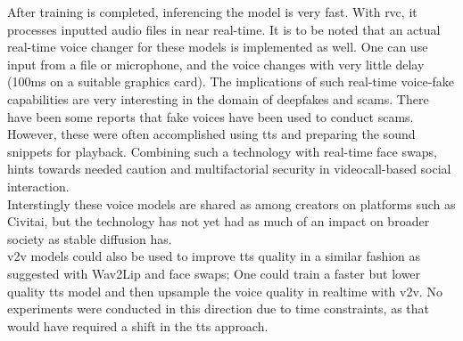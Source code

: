 \documentclass[
  a4paper,  %
  twoside,  %
  bibliography=totoc,
  headsepline,
  cleardoublepage=empty,
  parskip=half,
  draft=false
]{scrbook}
\begin{document}
After training is completed, inferencing the model is very fast. With \gls{rvc}, it processes inputted audio files in near real-time. It is to be noted that an actual real-time voice changer for these models is implemented as well\cite{WokadaVoicechangerVoice}. One can use input from a file or microphone, and the voice changes with very little delay (100ms on a suitable graphics card). The implications of such real-time voice-fake capabilities are very interesting in the domain of deepfakes and scams. There have been some reports that fake voices have been used to conduct scams. However, these were often accomplished using \gls{tts} and preparing the sound snippets for playback. Combining such a technology with real-time face swaps, hints towards needed caution and multifactorial security in videocall-based social interaction. \\
Interstingly these voice models are shared as among creators on platforms such as Civitai, but the technology has not yet had as much of an impact on broader society as stable diffusion has. \\
\gls{v2v} models could also be used to improve \gls{tts} quality in a similar fashion as suggested with Wav2Lip and face swaps; One could train a faster but lower quality \gls{tts} model and then upsample the voice quality in realtime with \gls{v2v}. No experiments were conducted in this direction due to time constraints, as that would have required a shift in the \gls{tts} approach.
\end{document}
